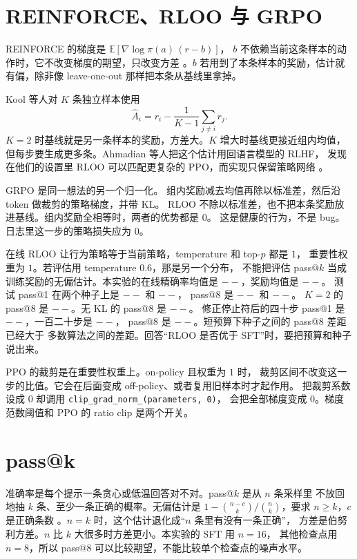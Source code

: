 \documentclass[10pt,twocolumn,a4paper]{ctexart}
\providecommand{\RlooKEightExactMean}{--}\providecommand{\RlooKEightRewardMean}{--}
\providecommand{\PassRlooKEightOne}{--}\providecommand{\PassRlooKEightEight}{--}
\providecommand{\PassRlooKEightSeedOneOne}{--}
\providecommand{\PassRlooKEightSeedOneEight}{--}
\providecommand{\PassRlooKTwoEight}{--}\providecommand{\PassRlooNoKlEight}{--}
\providecommand{\PassRlooStopOne}{--}\providecommand{\PassRlooLongOne}{--}
\providecommand{\PassRlooLongEight}{--}\providecommand{\PassIpoEight}{--}
\begin{document}
\section{REINFORCE、RLOO 与 GRPO}
REINFORCE 的梯度是 $\mathbb{E}[\nabla\log\pi(a)\,(r-b)]$，
$b$ 不依赖当前这条样本的动作时，它不改变梯度的期望，只改变方差
\citep{williams1992reinforce}。$b$ 若用到了本条样本的奖励，估计就有偏，除非像
leave-one-out 那样把本条从基线里拿掉。

Kool 等人对 $K$ 条独立样本使用\citep{kool2019buy}
\begin{equation}
\hat A_i=r_i-\frac{1}{K-1}\sum_{j\neq i}r_j.
\end{equation}
$K=2$ 时基线就是另一条样本的奖励，方差大。$K$ 增大时基线更接近组内均值，
但每步要生成更多条。Ahmadian 等人把这个估计用回语言模型的 RLHF，
发现在他们的设置里 RLOO 可以匹配更复杂的 PPO，而实现只保留策略网络
\citep{ahmadian2024rloo}。

GRPO 是同一想法的另一个归一化\citep{shao2024deepseekmath,deepseek2025r1}。
组内奖励减去均值再除以标准差，然后沿 token 做裁剪的策略梯度，并带 KL。
RLOO 不除以标准差，也不把本条奖励放进基线。组内奖励全相等时，两者的优势都是 $0$。
这是健康的行为，不是 bug。日志里这一步的策略损失应为 $0$。

在线 RLOO 让行为策略等于当前策略，temperature 和 top-$p$ 都是 $1$，
重要性权重为 $1$。若评估用 temperature $0.6$，那是另一个分布，
不能把评估 pass@$k$ 当成训练奖励的无偏估计。本实验的在线精确率均值是
$\RlooKEightExactMean$，奖励均值是 $\RlooKEightRewardMean$。
测试 pass@1 在两个种子上是 $\PassRlooKEightOne$ 和 $\PassRlooKEightSeedOneOne$，
pass@8 是 $\PassRlooKEightEight$ 和 $\PassRlooKEightSeedOneEight$。
$K=2$ 的 pass@8 是 $\PassRlooKTwoEight$。无 KL 的 pass@8 是 $\PassRlooNoKlEight$。
修正停止符后的四十步 pass@1 是 $\PassRlooStopOne$，一百二十步是 $\PassRlooLongOne$，
pass@8 是 $\PassRlooLongEight$。短预算下种子之间的 pass@8 差距已经大于
多数算法之间的差距。回答``RLOO 是否优于 SFT''时，要把预算和种子说出来。

PPO 的裁剪是在重要性权重上\citep{schulman2017ppo}。on-policy 且权重为 $1$ 时，
裁剪区间不改变这一步的比值。它会在后面变成 off-policy、或者复用旧样本时才起作用。
把裁剪系数设成 $0$ 却调用 \texttt{clip\_grad\_norm\_(parameters, 0)}，
会把全部梯度变成 $0$。梯度范数阈值和 PPO 的 ratio clip 是两个开关。

\section{pass@k}
准确率是每个提示一条贪心或低温回答对不对。pass@$k$ 是从 $n$ 条采样里
不放回地抽 $k$ 条、至少一条正确的概率。无偏估计是
$1-\binom{n-c}{k}/\binom{n}{k}$，要求 $n\ge k$，$c$ 是正确条数
\citep{chen2021codex}。$n=k$ 时，这个估计退化成``$n$ 条里有没有一条正确''，
方差是伯努利方差。$n$ 比 $k$ 大很多时方差更小。本实验的 SFT 用 $n=16$，
其他检查点用 $n=8$，所以 pass@8 可以比较期望，不能比较单个检查点的噪声水平。
\end{document}
